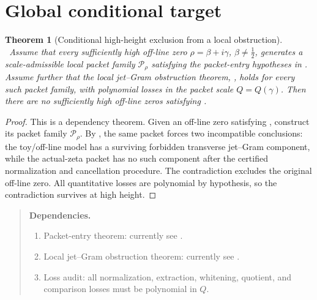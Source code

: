 \documentclass[11pt,a4paper]{amsart}
\newcommand{\Status}[1]{\textnormal{\fbox{\scriptsize\textsf{#1}}}}
\newcommand{\Open}{\Status{OPEN}}
\newcommand{\Conditional}{\Status{CONDITIONAL}}
\newcommand{\Packet}{\mathcal P}
\newcommand{\Scale}{Q}
\theoremstyle{plain}
\newtheorem{theorem}{Theorem}[section]
\theoremstyle{definition}
\newenvironment{dependencies}{%
  \begin{quote}\noindent\textbf{Dependencies.}\par\smallskip\small
  \begin{enumerate}[label=\textup{D\arabic*.},leftmargin=*]
}{\end{enumerate}\end{quote}}
\begin{document}
\section{Global conditional target}
\label{sec:global-conditional-target}

\begin{theorem}[Conditional high-height exclusion from a local obstruction]
\label{thm:conditional-high-height-exclusion}
\Conditional\
Assume that every sufficiently high off-line zero \(\rho=\beta+i\gamma\), \(\beta\ne \tfrac12\), generates a scale-admissible local packet family \(\Packet_\rho\) satisfying the packet-entry hypotheses in .  Assume further that the local jet--Gram obstruction theorem, , holds for every such packet family, with polynomial losses in the packet scale \(\Scale=\Scale(\gamma)\).  Then there are no sufficiently high off-line zeros satisfying .
\end{theorem}

\begin{proof}
This is a dependency theorem.  Given an off-line zero satisfying , construct its packet family \(\Packet_\rho\).  By , the same packet forces two incompatible conclusions: the toy/off-line model has a surviving forbidden transverse jet--Gram component, while the actual-zeta packet has no such component after the certified normalization and cancellation procedure.  The contradiction excludes the original off-line zero.  All quantitative losses are polynomial by hypothesis, so the contradiction survives at high height.
\end{proof}

\begin{dependencies}
\item Packet-entry theorem: currently \Open\; see .
\item Local jet--Gram obstruction theorem: currently \Open\; see .
\item Loss audit: all normalization, extraction, whitening, quotient, and comparison losses must be polynomial in \(\Scale\).
\end{dependencies}
\end{document}
